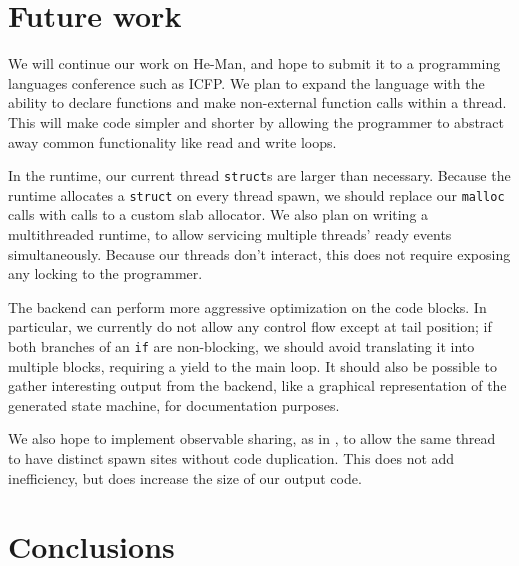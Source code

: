 \documentclass[preprint,11pt]{sigplanconf}
\renewcommand{\t}{\texttt}
\begin{document}

\section{Future work}

We will continue our work on He-Man, and hope to submit it to a programming
languages conference such as ICFP. We plan to expand the language with the
ability to declare functions and make non-external function calls within a
thread. This will make code simpler and shorter by allowing the programmer to
abstract away common functionality like read and write loops.

In the runtime, our current thread \t{struct}s are larger than necessary.
Because the runtime allocates a \t{struct} on every thread spawn, we should
replace our \t{malloc} calls with calls to a custom slab allocator. We also plan
on writing a multithreaded runtime, to allow servicing multiple threads' ready
events simultaneously. Because our threads don't interact, this does not require
exposing any locking to the programmer.

The backend can perform more aggressive optimization on the code blocks. In
particular, we currently do not allow any control flow except at tail position;
if both branches of an \t{if} are non-blocking, we should avoid translating it
into multiple blocks, requiring a yield to the main loop. It should also be
possible to gather interesting output from the backend, like a graphical
representation of the generated state machine, for documentation purposes.

We also hope to implement observable sharing, as in \cite{Gill}, to allow the
same thread to have distinct spawn sites without code duplication. This does not
add inefficiency, but does increase the size of our output code. 

\section{Conclusions}

{}

\end{document}

